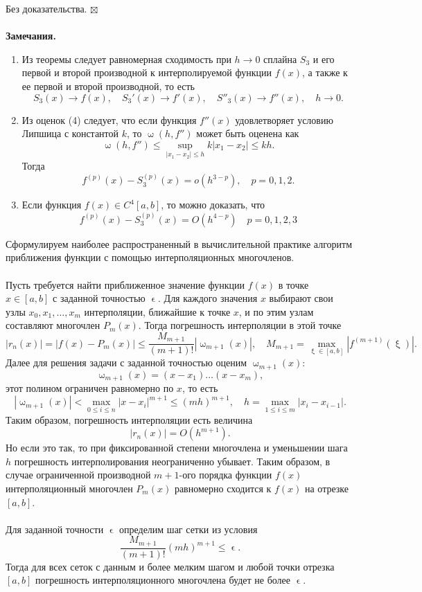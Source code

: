 \documentclass[a4paper, 12pt]{report}
\newenvironment{Proof} %
{\par\noindent{$\blacklozenge$}} %
{\hfill$\scriptstyle\boxtimes$}
\renewcommand{\leq}{\leqslant}
\renewcommand{\omega}{\upomega}
\renewcommand{\xi}{\upxi}
\renewcommand{\epsilon}{\upvarepsilon}
\begin{document}
	 \begin{Proof}
	 	Без доказательства.
	 \end{Proof}\\\\
	 \textbf{Замечания.}\begin{enumerate}
	 	\item Из теоремы следует равномерная сходимость при $h\to 0$ сплайна $S_3$ и его первой и второй производной к интерполируемой функции $f(x)$, а также к ее первой и второй производной, то есть $$S_3(x) \to f(x),\quad S_3'(x) \to f'(x),\quad S''_3(x)\to f''(x),\quad h\to 0.$$
	 	\item Из оценок (4) следует, что если функция $f''(x)$ удовлетворяет условию Липшица с константой $k$, то $\omega (h,f'')$ может быть оценена как $$\omega(h, f'') \leq \underset{|x_1-x_2| \leq h}{\sup} k|x_1 - x_2|\leq kh.$$
	 	Тогда $$f^{(p)}(x) - S^{(p)}_3(x) = o(h^{3-p}),\quad p=0,1,2.$$
	 	\item Если функция $f(x)\in C^4[a,b]$, то можно доказать, что $$f^{(p)}(x) - S_3^{(p)}(x) = O(h^{4-p}) \quad p=0,1,2,3$$
	 \end{enumerate}
	 Сформулируем наиболее распространенный в вычислительной практике алгоритм приближения функции с помощью интерполяционных многочленов.\\\\
	 Пусть требуется найти приближенное значение функции $f(x)$ в точке $x\in [a,b]$ с заданной точностью $\epsilon$. Для каждого значения $x$ выбирают свои узлы $x_0, x_1,\ldots, x_m$ интерполяции, ближайшие к точке $x$, и по этим узлам составляют многочлен $P_m(x)$. Тогда погрешность интерполяции в этой точке $$|r_n(x)| = |f(x) - P_m(x)| \leq \dfrac{M_{m+1}}{(m+1)!}|\omega_{m+1}(x)|,\quad M_{m+1} = \underset{\xi \in [a,b]}{\max}|f^{(m+1)} (\xi)|.$$
	 Далее для решения задачи с заданной точностью оценим $\omega_{m+1}(x)$:
	 $$\omega_{m+1}(x) = (x-x_1)\ldots (x-x_m),$$
	 этот полином ограничен равномерно по $x$, то есть $$|\omega_{m+1}(x)| < \underset{0 \leq i \leq n}{\max}|x-x_i|^{m+1}\leq (mh)^{m+1},\quad h = \underset{1 \leq i \leq m}{\max}|x_{i} - x_{i-1}|.$$
	 Таким образом, погрешность интерполяции есть величина $$|r_n(x)| = O(h^{m+1}).$$
	 Но если это так, то при фиксированной степени многочлена и уменьшении шага $h$ погрешность интерполирования неограниченно убывает. Таким образом, в случае ограниченной производной ${m+1}$-ого порядка функции $f(x)$ интерполяционный многочлен $P_m(x)$ равномерно сходится к $f(x)$ на отрезке $[a,b]$.\\\\
	 Для заданной точности $\epsilon$ определим шаг сетки из условия $$\dfrac{M_{m+1}}{(m+1)!}(mh)^{m+1}\leq \epsilon.$$
	 Тогда для всех сеток с данным и более мелким шагом и любой точки отрезка $[a,b]$ погрешность интерполяционного многочлена будет не более $\epsilon$.
\end{document}
